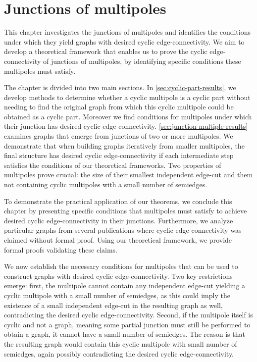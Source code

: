 \documentclass[12pt, twoside]{book}
\begin{document}
\chapter{Junctions of multipoles}

This chapter investigates the junctions of multipoles and identifies the conditions under which they yield graphs with desired cyclic edge-connectivity. We aim to develop a theoretical framework that enables us to prove the cyclic edge-connectivity of junctions of multipoles, by identifying specific conditions these multipoles must satisfy.

The chapter is divided into two main sections. In \cref{sec:cyclic-part-results}, we develop methods to determine whether a cyclic multipole is a cyclic part without needing to find the original graph from which this cyclic multipole could be obtained as a cyclic part. Moreover we find conditions for multipoles under which their junction has desired cyclic edge-connectivity. \cref{sec:junction-multiple-results} examines graphs that emerge from junctions of two or more multipoles. We demonstrate that when building graphs iteratively from smaller multipoles, the final structure has desired cyclic edge-connectivity if each intermediate step satisfies the conditions of our theoretical frameworks. Two properties of multipoles prove crucial: the size of their smallest independent edge-cut and them not containing cyclic multipoles with a small number of semiedges.

To demonstrate the practical application of our theorems, we conclude this chapter by presenting specific conditions that multipoles must satisfy to achieve desired cyclic edge-connectivity in their junctions. Furthermore, we analyze particular graphs from several publications \cite{Macajova2006, Kochol1996} where cyclic edge-connectivity was claimed without formal proof. Using our theoretical framework, we provide formal proofs validating these claims.

We now establish the necessary conditions for multipoles that can be used to construct graphs with desired cyclic edge-connectivity. Two key restrictions emerge: first, the multipole cannot contain any independent edge-cut yielding a cyclic multipole with a small number of semiedges, as this could imply the existence of a small independent edge-cut in the resulting graph as well, contradicting the desired cyclic edge-connectivity. Second, if the multipole itself is cyclic and not a graph, meaning some partial junction must still be performed to obtain a graph, it cannot have a small number of semiedges. The reason is that the resulting graph would contain this cyclic multipole with small number of semiedges, again possibly contradicting the desired cyclic edge-connectivity.
\end{document}
